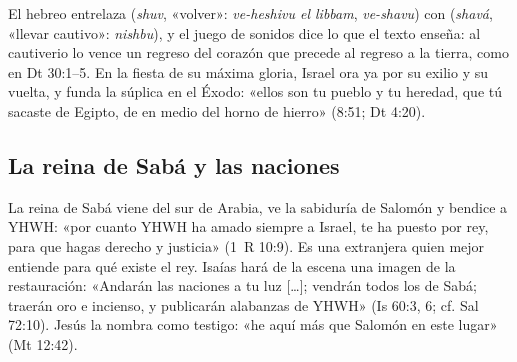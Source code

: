 El hebreo entrelaza  (\emph{shuv}, «volver»: \emph{ve-heshivu el libbam}, \emph{ve-shavu}) con  (\emph{shavá}, «llevar cautivo»: \emph{nishbu}), y el juego de sonidos dice lo que el texto enseña: al cautiverio lo vence un regreso del corazón que precede al regreso a la tierra, como en Dt 30:1--5. En la fiesta de su máxima gloria, Israel ora ya por su exilio y su vuelta, y funda la súplica en el Éxodo: «ellos son tu pueblo y tu heredad, que tú sacaste de Egipto, de en medio del horno de hierro» (8:51; Dt 4:20).

\subsection{La reina de Sabá y las naciones}
La reina de Sabá viene del sur de Arabia, ve la sabiduría de Salomón y bendice a YHWH: «por cuanto YHWH ha amado siempre a Israel, te ha puesto por rey, para que hagas derecho y justicia» (1~R 10:9). Es una extranjera quien mejor entiende para qué existe el rey. Isaías hará de la escena una imagen de la restauración: «Andarán las naciones a tu luz [\ldots]; vendrán todos los de Sabá; traerán oro e incienso, y publicarán alabanzas de YHWH» (Is 60:3, 6; cf. Sal 72:10). Jesús la nombra como testigo: «he aquí más que Salomón en este lugar» (Mt 12:42).

